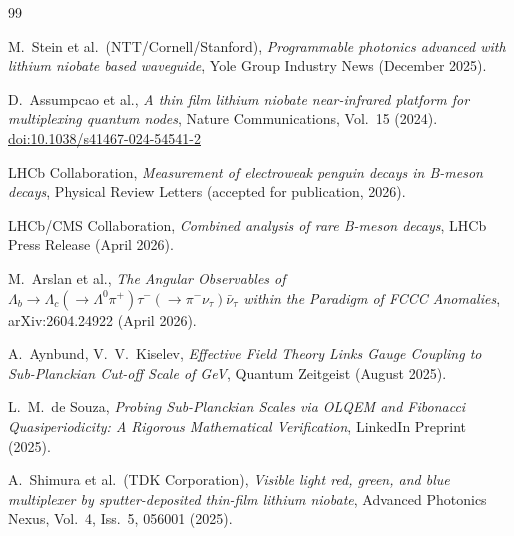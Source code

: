 	\begin{thebibliography}{99}
		
		M.~Stein et al.\ (NTT/Cornell/Stanford), 
		\textit{Programmable photonics advanced with lithium niobate based waveguide},
		Yole Group Industry News (December 2025).
		
		D.~Assumpcao et al., 
		\textit{A thin film lithium niobate near-infrared platform for multiplexing quantum nodes},
		Nature Communications, Vol.~15 (2024).
		\href{https://doi.org/10.1038/s41467-024-54541-2}{doi:10.1038/s41467-024-54541-2}
		
		LHCb Collaboration, 
		\textit{Measurement of electroweak penguin decays in B-meson decays},
		Physical Review Letters (accepted for publication, 2026).
		
		LHCb/CMS Collaboration,
		\textit{Combined analysis of rare B-meson decays},
		LHCb Press Release (April 2026).
		
		M.~Arslan et al., 
		\textit{The Angular Observables of $\Lambda_b \to \Lambda_c(\to \Lambda^0 \pi^+) \tau^-(\to \pi^- \nu_\tau) \bar{\nu}_\tau$ within the Paradigm of FCCC Anomalies},
		arXiv:2604.24922 (April 2026).
		
		A.~Aynbund, V.~V.~Kiselev, 
		\textit{Effective Field Theory Links Gauge Coupling to Sub-Planckian Cut-off Scale of GeV},
		Quantum Zeitgeist (August 2025).
		
		L.~M.~de Souza, 
		\textit{Probing Sub-Planckian Scales via OLQEM and Fibonacci Quasiperiodicity: A Rigorous Mathematical Verification},
		LinkedIn Preprint (2025).
		
		A.~Shimura et al.\ (TDK Corporation), 
		\textit{Visible light red, green, and blue multiplexer by sputter-deposited thin-film lithium niobate},
		Advanced Photonics Nexus, Vol.~4, Iss.~5, 056001 (2025).
		
	\end{thebibliography}

